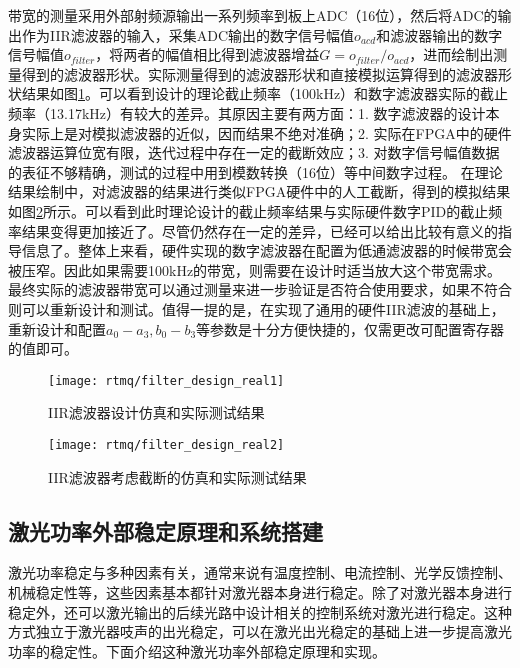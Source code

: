 带宽的测量采用外部射频源输出一系列频率到板上ADC（16位），然后将ADC的输出作为IIR滤波器的输入，采集ADC输出的数字信号幅值$o_{acd}$和滤波器输出的数字信号幅值$o_{filter}$，将两者的幅值相比得到滤波器增益$G=o_{filter}/o_{acd}$，进而绘制出测量得到的滤波器形状。实际测量得到的滤波器形状和直接模拟运算得到的滤波器形状结果如图\ref{fig:filter_design_real1}。可以看到设计的理论截止频率（100kHz）和数字滤波器实际的截止频率（13.17kHz）有较大的差异。其原因主要有两方面：1. 数字滤波器的设计本身实际上是对模拟滤波器的近似，因而结果不绝对准确；2. 实际在FPGA中的硬件滤波器运算位宽有限，迭代过程中存在一定的截断效应；3. 对数字信号幅值数据的表征不够精确，测试的过程中用到模数转换（16位）等中间数字过程。
在理论结果绘制中，对滤波器的结果进行类似FPGA硬件中的人工截断，得到的模拟结果如图\ref{fig:filter_design_real2}所示。可以看到此时理论设计的截止频率结果与实际硬件数字PID的截止频率结果变得更加接近了。尽管仍然存在一定的差异，已经可以给出比较有意义的指导信息了。整体上来看，硬件实现的数字滤波器在配置为低通滤波器的时候带宽会被压窄。因此如果需要100kHz的带宽，则需要在设计时适当放大这个带宽需求。最终实际的滤波器带宽可以通过测量来进一步验证是否符合使用要求，如果不符合则可以重新设计和测试。值得一提的是，在实现了通用的硬件IIR滤波的基础上，重新设计和配置$a_0-a_3, b_0-b_3$等参数是十分方便快捷的，仅需更改可配置寄存器的值即可。

\begin{figure}
    \centering
    \caption[IIR滤波器设计仿真和实际测试结果]{IIR滤波器设计仿真和实际测试结果\label{fig:filter_design_real1}}
    \texttt{[image: rtmq/filter\_design\_real1]}
\end{figure}



\begin{figure}
    \centering
    \caption[IIR滤波器考虑截断的仿真和实际测试结果]{IIR滤波器考虑截断的仿真和实际测试结果\label{fig:filter_design_real2}}
    \texttt{[image: rtmq/filter\_design\_real2]}
\end{figure}

\newpage
\subsection[激光功率外部稳定原理和系统搭建]{激光功率外部稳定原理和系统搭建}
激光功率稳定与多种因素有关，通常来说有温度控制、电流控制、光学反馈控制、机械稳定性等，这些因素基本都针对激光器本身进行稳定。除了对激光器本身进行稳定外，还可以激光输出的后续光路中设计相关的控制系统对激光进行稳定。这种方式独立于激光器吱声的出光稳定，可以在激光出光稳定的基础上进一步提高激光功率的稳定性。下面介绍这种激光功率外部稳定原理和实现。

